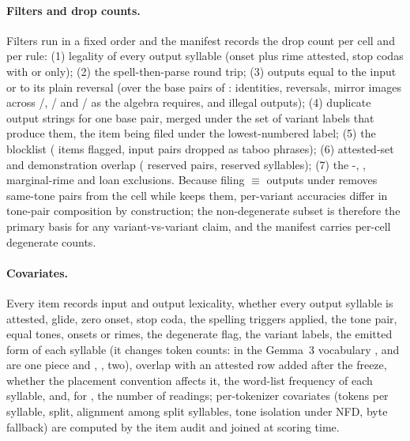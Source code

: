 \paragraph{Filters and drop counts.}
Filters run in a fixed order and the manifest records the drop count per cell and per rule: (1) legality of every output syllable (onset plus rime attested, stop codas with  or  only); (2) the spell-then-parse round trip; (3) outputs equal to the input or to its plain reversal (over the \releaseNBasePairs{} base pairs of \releaseVersion{}: \releaseDropIdentity{} identities, \releaseDropReversal{} reversals, mirror images across /, / and / as the algebra requires, and \releaseDropIllegal{} illegal outputs); (4) duplicate output strings for one base pair, merged under the set of variant labels that produce them, the item being filed under the lowest-numbered label; (5) the blocklist (\releaseNVulgar{} items flagged, \releaseDropVulgarInput{} input pairs dropped as taboo phrases); (6) attested-set and demonstration overlap (\releaseNReservedPairs{} reserved pairs, \releaseNReservedSyllables{} reserved syllables); (7) the -, , marginal-rime and loan exclusions. Because filing $\equiv$ outputs under  removes same-tone pairs from the  cell while  keeps them, per-variant accuracies differ in tone-pair composition by construction; the non-degenerate subset is therefore the primary basis for any variant-vs-variant claim, and the manifest carries per-cell degenerate counts.

\paragraph{Covariates.}
Every item records input and output lexicality, whether every output syllable is attested, glide, zero onset, stop coda, the spelling triggers applied, the tone pair, equal tones, onsets or rimes, the degenerate flag, the variant labels, the emitted  form of each syllable (it changes token counts: in the Gemma~3 vocabulary ,  and  are one piece and , ,  two), overlap with an attested row added after the freeze, whether the placement convention affects it, the word-list frequency of each syllable, and, for , the number of readings; per-tokenizer covariates (tokens per syllable, split, alignment among split syllables, tone isolation under NFD, byte fallback) are computed by the item audit and joined at scoring time.

